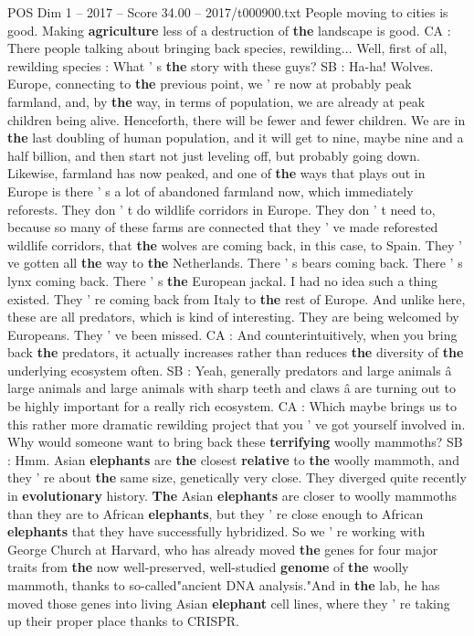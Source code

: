 \begin{textsample}{POS Dim 1 – 2017 – Score 34.00 – 2017/t000900.txt}
People moving to cities is good.
Making \textbf{agriculture} less of a destruction of \textbf{the} landscape is good.
CA : There people talking about bringing back species, rewilding...
Well, first of all, rewilding species : What ' s \textbf{the} story with these guys?
SB : Ha-ha!
Wolves.
Europe, connecting to \textbf{the} previous point, we ' re now at probably peak farmland, and, by \textbf{the} way, in terms of population, we are already at peak children being alive.
Henceforth, there will be fewer and fewer children.
We are in \textbf{the} last doubling of human population, and it will get to nine, maybe nine and a half billion, and then start not just leveling off, but probably going down.
Likewise, farmland has now peaked, and one of \textbf{the} ways that plays out in Europe is there ' s a lot of abandoned farmland now, which immediately reforests.
They don ' t do wildlife corridors in Europe.
They don ' t need to, because so many of these farms are connected that they ' ve made reforested wildlife corridors, that \textbf{the} wolves are coming back, in this case, to Spain.
They ' ve gotten all \textbf{the} way to \textbf{the} Netherlands.
There ' s bears coming back.
There ' s lynx coming back.
There ' s \textbf{the} European jackal.
I had no idea such a thing existed.
They ' re coming back from Italy to \textbf{the} rest of Europe.
And unlike here, these are all predators, which is kind of interesting.
They are being welcomed by Europeans.
They ' ve been missed.
CA : And counterintuitively, when you bring back \textbf{the} predators, it actually increases rather than reduces \textbf{the} diversity of \textbf{the} underlying ecosystem often.
SB : Yeah, generally predators and large animals â large animals and large animals with sharp teeth and claws â are turning out to be highly important for a really rich ecosystem.
CA : Which maybe brings us to this rather more dramatic rewilding project that you ' ve got yourself involved in.
Why would someone want to bring back these \textbf{terrifying} woolly mammoths?
SB : Hmm.
Asian \textbf{elephants} are \textbf{the} closest \textbf{relative} to \textbf{the} woolly mammoth, and they ' re about \textbf{the} same size, genetically very close.
They diverged quite recently in \textbf{evolutionary} history. \textbf{The} Asian \textbf{elephants} are closer to woolly mammoths than they are to African \textbf{elephants}, but they ' re close enough to African \textbf{elephants} that they have successfully hybridized.
So we ' re working with George Church at Harvard, who has already moved \textbf{the} genes for four major traits from \textbf{the} now well-preserved, well-studied \textbf{genome} of \textbf{the} woolly mammoth, thanks to so-called"ancient DNA analysis."And in \textbf{the} lab, he has moved those genes into living Asian \textbf{elephant} cell lines, where they ' re taking up their proper place thanks to CRISPR.

\end{textsample}
